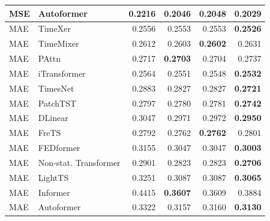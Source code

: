 \begin{longtable}{llrrrr}
MSE & Autoformer & 0.2216 & 0.2046 & 0.2048 & \textbf{0.2029} \\
\midrule
MAE & TimeXer & 0.2556 & 0.2553 & 0.2553 & \textbf{0.2526} \\
MAE & TimeMixer & 0.2612 & 0.2603 & \textbf{0.2602} & 0.2631 \\
MAE & PAttn & 0.2717 & \textbf{0.2703} & 0.2704 & 0.2737 \\
MAE & iTransformer & 0.2564 & 0.2551 & 0.2548 & \textbf{0.2532} \\
MAE & TimesNet & 0.2883 & 0.2827 & 0.2827 & \textbf{0.2721} \\
MAE & PatchTST & 0.2797 & 0.2780 & 0.2781 & \textbf{0.2742} \\
MAE & DLinear & 0.3047 & 0.2971 & 0.2972 & \textbf{0.2950} \\
MAE & FreTS & 0.2792 & 0.2762 & \textbf{0.2762} & 0.2801 \\
MAE & FEDformer & 0.3155 & 0.3047 & 0.3047 & \textbf{0.3003} \\
MAE & Non-stat. Transformer & 0.2901 & 0.2823 & 0.2823 & \textbf{0.2706} \\
MAE & LightTS & 0.3251 & 0.3087 & 0.3087 & \textbf{0.3065} \\
MAE & Informer & 0.4415 & \textbf{0.3607} & 0.3609 & 0.3884 \\
MAE & Autoformer & 0.3322 & 0.3157 & 0.3160 & \textbf{0.3130} \\
\end{longtable}
\endgroup

